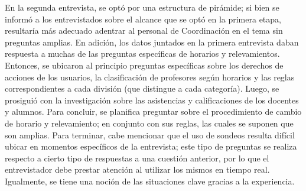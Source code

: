 \newline
\normalsize{ \indent
En la segunda entrevista, se optó por una estructura de
pirámide; si bien se informó a los entrevistados sobre el
alcance que se optó en la primera etapa, resultaría más
adecuado adentrar al personal de Coordinación en el tema sin
preguntas amplias. En adición, los datos juntados en la primera
entrevista daban respuesta a muchas de las preguntas específicas
de horarios y relevamientos. Entonces, se ubicaron al principio
preguntas específicas sobre los derechos de acciones de los
usuarios, la clasificación de profesores según horarios y las
reglas correspondientes a cada división (que distingue a cada
categoría). Luego, se prosiguió con la investigación sobre las
asistencias y calificaciones de los docentes y alumnos. Para
concluir, se planifica preguntar sobre el procedimiento de
cambio de horario y relevamiento; en conjunto con sus reglas,
las cuales se suponen que son amplias.
}
\newline
\normalsize{ \indent
Para terminar, cabe mencionar que el uso de sondeos resulta
difícil ubicar en momentos específicos de la entrevista; este
tipo de preguntas se realiza respecto a cierto tipo de respuestas
a una cuestión anterior, por lo que el entrevistador debe prestar
atención al utilizar los mismos en tiempo real. Igualmente, se
tiene una noción de las situaciones clave gracias a la
experiencia.
}
